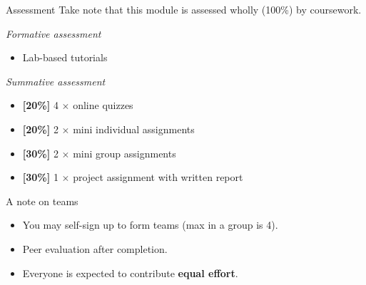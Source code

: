 \documentclass[,aspectratio=169]{beamer}
\providecommand{\tightlist}{%
  \setlength{\itemsep}{0pt}\setlength{\parskip}{0pt}}
\begin{document}
\begin{frame}{Assessment}
\protect\hypertarget{assessment}{}
Take note that this module is assessed wholly (100\%) by coursework.

\vspace{0.5em}

\emph{Formative assessment}

\begin{itemize}
\tightlist
\item
  Lab-based tutorials
\end{itemize}

\emph{Summative assessment}

\begin{itemize}
\tightlist
\item
  \textbf{{[}20\%{]}} 4 \(\times\) online quizzes
\item
  \textbf{{[}20\%{]}} 2 \(\times\) mini individual assignments
\item
  \textbf{{[}30\%{]}} 2 \(\times\) mini group assignments
\item
  \textbf{{[}30\%{]}} 1 \(\times\) project assignment with written
  report
\end{itemize}

\vspace{0.5em}
\pause

\begin{block}{A note on teams}
\protect\hypertarget{a-note-on-teams}{}
\begin{itemize}
\tightlist
\item
  You may self-sign up to form teams (max in a group is 4).
\item
  Peer evaluation after completion.
\item
  Everyone is expected to contribute \textbf{equal effort}.
\end{itemize}
\end{block}
\end{frame}
\end{document}

